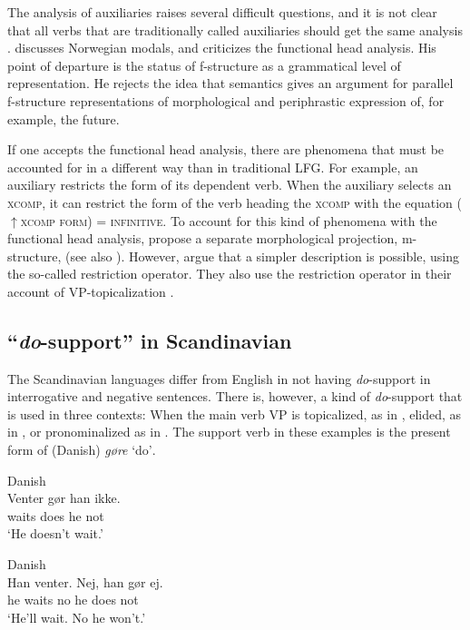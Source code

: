 \documentclass[output=paper,hidelinks]{langscibook}
\begin{document}
\noindent The analysis of auxiliaries raises several difficult questions, and it is not clear that all verbs that are traditionally called auxiliaries should get the same analysis \citep{Falk08}. \citet{dyvik99} discusses Norwegian modals, and criticizes the functional head analysis. His point of departure is the status of f-structure as a grammatical level of representation. He rejects the idea that semantics gives an argument for parallel f-structure representations of morphological and periphrastic expression of, for example, the future.

 If one accepts the functional head analysis, there are phenomena that must be accounted for in a different way than in traditional LFG. For example, an auxiliary restricts the form of its dependent verb. When the auxiliary selects an \textsc{xcomp}, it can restrict the form of the verb heading the \textsc{xcomp} with the equation (${\uparrow}$\textsc{xcomp} \textsc{form}) = \textsc{infinitive}. To account for this kind of phenomena with the functional head analysis, \citet{butt-etal2004} propose a separate morphological projection, m-structure, (see also \citealt{FrankZaenen2004}). However, \citet{WO03} argue that a simpler description is possible, using the so-called restriction operator. They also use the restriction operator in their account of VP-topicalization \citep{WO04}.

\subsection{ ``\textit{do}{}-support'' in Scandinavian}

The Scandinavian languages differ from English in not having \textit{do}{}-support in interrogative and negative sentences. There is, however, a kind of \textit{do}{}-support that is used in three contexts: When the main verb VP is topicalized, as in , elided, as in , or pronominalized as in . The support verb in these examples is the present form of (Danish) \textit{gøre} `do\textsc{{}'}.



\ea\label{ex:Scandinavian:58} Danish \citep[410]{Oersnes11}\\
\gll
 {Venter} {gør} {han} {ikke}\textsc{.}\\
 waits does he not\\
\glt `He doesn’t wait.'\z



\ea\label{ex:Scandinavian:59} Danish \citep[410]{Oersnes11}\\
\gll
 {Han} {venter.} {Nej,} {han} {gør} {ej}\textsc{.}\\
 he waits no he does not \\
\glt `He’ll wait. No he won’t.'\z
\end{document}
